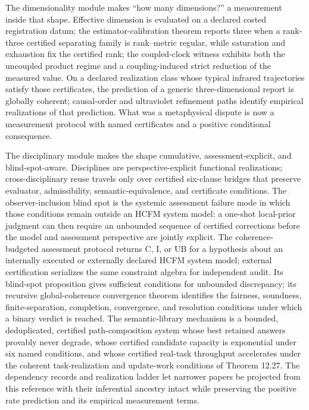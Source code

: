 \documentclass[11pt]{article}
\theoremstyle{definition}
\begin{document}
The dimensionality module makes ``how many dimensions?'' a measurement inside that shape. Effective dimension is evaluated on a declared costed registration datum; the estimator-calibration theorem reports three when a rank-three certified separating family is rank--metric regular, while saturation and exhaustion fix the certified rank; the coupled-clock witness exhibits both the uncoupled product regime and a coupling-induced strict reduction of the measured value. On a declared realization class whose typical infrared trajectories satisfy those certificates, the prediction of a generic three-dimensional report is globally coherent; causal-order and ultraviolet refinement paths identify empirical realizations of that prediction. What was a metaphysical dispute is now a measurement protocol with named certificates and a positive conditional consequence.

The disciplinary module makes the shape cumulative, assessment-explicit, and blind-spot-aware. Disciplines are perspective-explicit functional realizations; cross-disciplinary reuse travels only over certified six-clause bridges that preserve evaluator, admissibility, semantic-equivalence, and certificate conditions. The observer-inclusion blind spot is the systemic assessment failure mode in which those conditions remain outside an HCFM system model: a one-shot local-prior judgment can then require an unbounded sequence of certified corrections before the model and assessment perspective are jointly explicit. The coherence-budgeted assessment protocol returns C, I, or UB for a hypothesis about an internally executed or externally declared HCFM system model; external certification serializes the same constraint algebra for independent audit. Its blind-spot proposition gives sufficient conditions for unbounded discrepancy; its recursive global-coherence convergence theorem identifies the fairness, soundness, finite-separation, completion, convergence, and resolution conditions under which a binary verdict is reached. The semantic-library mechanism is a bounded, deduplicated, certified path-composition system whose best retained answers provably never degrade, whose certified candidate capacity is exponential under six named conditions, and whose certified real-task throughput accelerates under the coherent task-realization and update-work conditions of Theorem 12.27. The dependency records and realization ladder let narrower papers be projected from this reference with their inferential ancestry intact while preserving the positive rate prediction and its empirical measurement terms.
\end{document}
